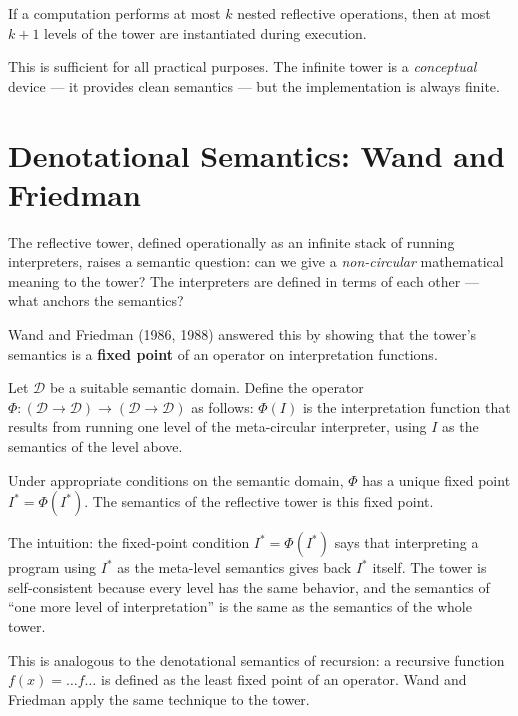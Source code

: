 \begin{proposition}
If a computation performs at most $k$ nested reflective operations, then at most $k + 1$ levels of the tower are instantiated during execution.

This is sufficient for all practical purposes. The infinite tower is a \textit{conceptual} device --- it provides clean semantics --- but the implementation is always finite.
\end{proposition}

\section{Denotational Semantics: Wand and Friedman}

The reflective tower, defined operationally as an infinite stack of running interpreters, raises a semantic question: can we give a \textit{non-circular} mathematical meaning to the tower? The interpreters are defined in terms of each other --- what anchors the semantics?

Wand and Friedman (1986, 1988) answered this by showing that the tower's semantics is a \textbf{fixed point} of an operator on interpretation functions.

\begin{definition}
Let $\mathcal{D}$ be a suitable semantic domain. Define the operator $\Phi: (\mathcal{D} \to \mathcal{D}) \to (\mathcal{D} \to \mathcal{D})$ as follows: $\Phi(I)$ is the interpretation function that results from running one level of the meta-circular interpreter, using $I$ as the semantics of the level above.
\end{definition}

\begin{theorem}
Under appropriate conditions on the semantic domain, $\Phi$ has a unique fixed point $I^* = \Phi(I^*)$. The semantics of the reflective tower is this fixed point.

The intuition: the fixed-point condition $I^* = \Phi(I^*)$ says that interpreting a program using $I^*$ as the meta-level semantics gives back $I^*$ itself. The tower is self-consistent because every level has the same behavior, and the semantics of ``one more level of interpretation'' is the same as the semantics of the whole tower.

This is analogous to the denotational semantics of recursion: a recursive function $f(x) = \ldots f \ldots$ is defined as the least fixed point of an operator. Wand and Friedman apply the same technique to the tower.
\end{theorem}

